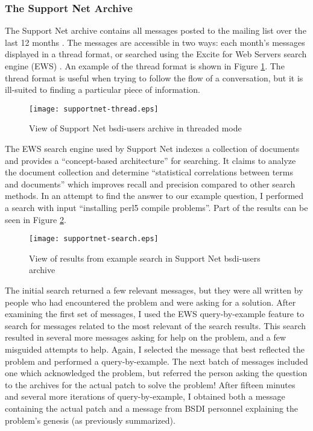 \subsubsection{The Support Net Archive}
The Support Net archive contains all messages posted to the mailing list over
the last 12 months \cite{supportnet-bsdi}. The messages are accessible in two
ways: each month's messages displayed in a thread format, or searched using the
Excite for Web Servers search engine (EWS) \cite{ews-website}. An example of
the thread format is shown in Figure \ref{fig:supportnet-thread}. The thread
format is useful when trying to follow the flow of a conversation, but it is
ill-suited to finding a particular piece of information.

\begin{figure}[htbp]
  \centering
  \texttt{[image: supportnet-thread.eps]}
  \caption{View of Support Net bsdi-users archive in threaded mode}
  \label{fig:supportnet-thread}
\end{figure}

The EWS search engine used by Support Net indexes a collection of documents and
provides a ``concept-based architecture'' for searching. It claims to analyze
the document collection and determine ``statistical correlations between terms
and documents'' which improves recall and precision compared to other search
methods. In an attempt to find the answer to our example question, I performed
a search with input ``installing perl5 compile problems''. Part of the results
can be seen in Figure \ref{fig:supportnet-search}.

\begin{figure}[htbp]
  \centering
  \texttt{[image: supportnet-search.eps]}
  \caption{View of results from example search in Support Net bsdi-users archive}
  \label{fig:supportnet-search}
\end{figure}

The initial search returned a few relevant messages, but they were all written
by people who had encountered the problem and were asking for a solution. After
examining the first set of messages, I used the EWS query-by-example feature to
search for messages related to the most relevant of the search results. This
search resulted in several more messages asking for help on the problem, and a
few misguided attempts to help. Again, I selected the message that best
reflected the problem and performed a query-by-example. The next batch of
messages included one which acknowledged the problem, but referred the person
asking the question to the archives for the actual patch to solve the problem!
After fifteen minutes and several more iterations of query-by-example, I
obtained both a message containing the actual patch and a message from BSDI
personnel explaining the problem's genesis (as previously summarized).

